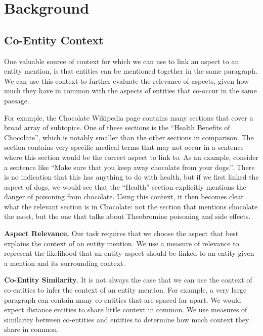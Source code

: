 \documentclass[sigconf,authordraft]{acmart}
\begin{document}
\section{Background}


\subsection{Co-Entity Context}\label{jordan-co-entity}
One valuable source of context for which we can use to link an aspect to an entity mention, is that entities can be mentioned together in the same paragraph.
We can use this context to further evaluate the relevance of aspects, given how much they have in common with the aspects of entities that co-occur in the same passage. 

For example, the Chocolate Wikipedia page contains many sections that cover a broad array of subtopics. One of these sections is the ``Health Benefits of Chocolate'', which is notably smaller than the other sections in comparison. The section contains very specific medical terms that may not occur in a sentence where this section would be the correct aspect to link to. As an example, consider a sentence like ``Make sure that you keep away chocolate from your dogs.''. There is no indication that this has anything to do with health, but if we first linked the aspect of dogs, we would see that the ``Health'' section explicitly mentions the danger of poisoning from chocolate. Using this context, it then becomes clear what the relevant section is in Chocolate: not the section that mentions chocolate the most, but the one that talks about Theobromine poisoning and side effects.

\textbf{Aspect Relevance.} Our task requires that we choose the aspect that best explains the context of an entity mention. We use a measure of relevance to represent the likelihood that an entity aspect should be linked to an entity given a mention and its surrounding context.

\textbf{Co-Entity Similarity}. It is not always the case that we can use the context of co-entities to infer the context of an entity mention. For example, a very large paragraph can contain many co-entities that are spaced far apart. We would expect distance entities to share little context in common.
We use measures of similarity between co-entities and entities to determine how much context they share in common.
\end{document}
